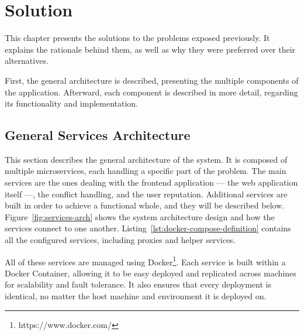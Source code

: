 \chapter{Solution}\label{chap:solution}

This chapter presents the solutions to the problems exposed previously. It explains the rationale behind them, as well as why they were preferred over their alternatives.

First, the general architecture is described, presenting the multiple components of the application. Afterward, each component is described in more detail, regarding its functionality and implementation.

\section{General Services Architecture}

This section describes the general architecture of the system. It is composed of multiple microservices, each handling a specific part of the problem. The main services are the ones dealing with the frontend application --- the web application itself ---, the conflict handling, and the user reputation. Additional services are built in order to achieve a functional whole, and they will be described below. Figure~\ref{fig:services-arch} shows the system architecture design and how the services connect to one another. Listing~\ref{lst:docker-compose-definition} contains all the configured services, including proxies and helper services.

All of these services are managed using Docker\footnote{https://www.docker.com/}. Each service is built within a Docker Container, allowing it to be easy deployed and replicated across machines for scalability and fault tolerance. It also ensures that every deployment is identical, no matter the host machine and environment it is deployed on.

